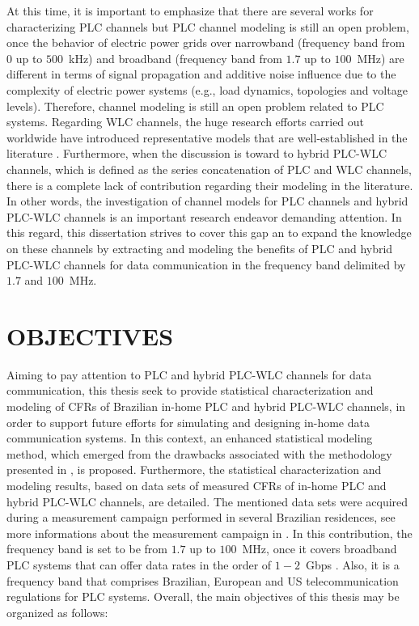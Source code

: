 At this time, it is important to emphasize that there are several works for characterizing \ac{PLC} channels but \ac{PLC} channel modeling is still an open problem, once the behavior of electric power grids over narrowband (frequency band from $0$ up to $500$~kHz) and broadband (frequency band from $1.7$ up to $100$~MHz) are different in terms of signal propagation and additive noise influence due to the complexity of electric power systems (e.g., load dynamics, topologies and voltage levels). Therefore, channel modeling is still an open problem related to \ac{PLC} systems. Regarding \ac{WLC} channels, the huge research efforts carried out worldwide have introduced representative models that are well-established in the literature \cite{COST,802.15,Hiperlan2}. Furthermore, when the discussion is toward to hybrid \ac{PLC}-\ac{WLC} channels, which is defined as the series concatenation of \ac{PLC} and \ac{WLC} channels, there is a complete lack of contribution regarding their modeling in the literature. In other words, the investigation of channel models for \ac{PLC} channels and hybrid \ac{PLC}-\ac{WLC} channels is an important research endeavor demanding attention. In this regard, this dissertation strives to cover this gap an to expand the knowledge on these channels by extracting and modeling the benefits of \ac{PLC} and hybrid \ac{PLC}-\ac{WLC} channels for data communication in the frequency band delimited by $1.7$ and $100$~MHz.


\section{OBJECTIVES} \label{sec:I1}

Aiming to pay attention to \ac{PLC} and hybrid \ac{PLC}-\ac{WLC} channels for data communication, this thesis seek to provide statistical characterization and modeling of \acp{CFR} of Brazilian in-home \ac{PLC} and hybrid \ac{PLC}-\ac{WLC} channels, in order to support future efforts for simulating and designing in-home data communication systems. In this context, an enhanced statistical modeling method, which emerged from the drawbacks associated with the methodology presented in \cite{Luis:AI,Luis:doc}, is proposed. Furthermore, the statistical characterization and modeling results, based on data sets of measured \acp{CFR} of in-home \ac{PLC} and hybrid \ac{PLC}-\ac{WLC} channels, are detailed.
The mentioned data sets were acquired during a measurement campaign performed in several Brazilian residences, see more informations about the measurement campaign in \cite{Thiago:Characterization,thiago:hyb,thiago:hyb2,thiago:doc}. In this contribution, the frequency band is set to be from $1.7$ up to $100$~MHz, once it covers broadband \ac{PLC} systems that can offer data rates in the order of $1-2$~Gbps \cite{Galli:indoor,Thiago:Characterization}. Also, it is a frequency band that comprises Brazilian, European and US telecommunication regulations for \ac{PLC} systems. Overall, the main objectives of this thesis may be organized as follows:

